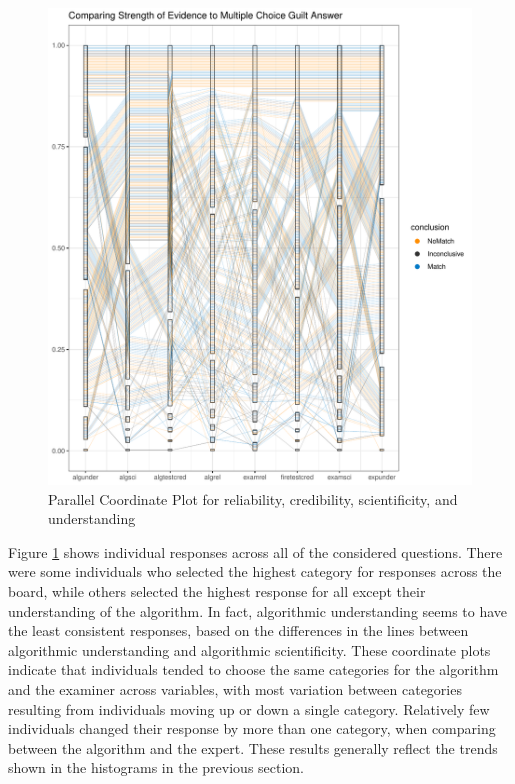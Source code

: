 \documentclass[print]{nuthesis}
\begin{document}
\begin{figure}
\includegraphics[width=\linewidth]{thesis_files/figure-latex/allpcp-1} \caption{Parallel Coordinate Plot for reliability, credibility, scientificity, and understanding}\label{fig:allpcp}
\end{figure}

Figure \ref{fig:allpcp} shows individual responses across all of the considered questions.
There were some individuals who selected the highest category for responses across the board, while others selected the highest response for all except their understanding of the algorithm.
In fact, algorithmic understanding seems to have the least consistent responses, based on the differences in the lines between algorithmic understanding and algorithmic scientificity.
These coordinate plots indicate that individuals tended to choose the same categories for the algorithm and the examiner across variables, with most variation between categories resulting from individuals moving up or down a single category.
Relatively few individuals changed their response by more than one category, when comparing between the algorithm and the expert.
These results generally reflect the trends shown in the histograms in the previous section.
\end{document}
